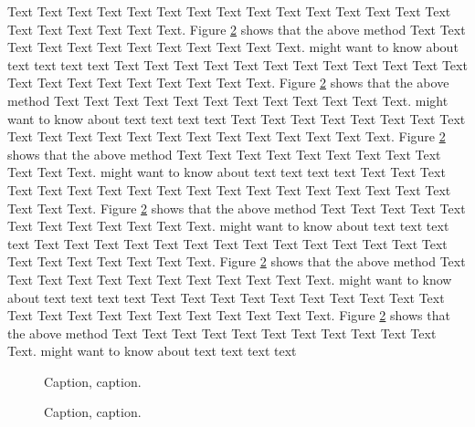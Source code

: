 \documentclass{Rpd}
\begin{document}
Text Text Text Text Text Text  Text Text Text Text Text Text Text Text Text  Text Text Text Text Text Text. Figure \ref{fig:02} shows that the above method  Text Text Text Text  Text Text Text Text Text Text  Text Text.  \cite{Boffelli03} might want to know about  text text text text
Text Text Text Text Text Text  Text Text Text Text Text Text Text Text Text  Text Text Text Text Text Text. Figure \ref{fig:02} shows that the above method  Text Text Text Text  Text Text Text Text Text Text  Text Text.  \cite{Boffelli03} might want to know about  text text text text
Text Text Text Text Text Text  Text Text Text Text Text Text Text Text Text  Text Text Text Text Text Text. Figure \ref{fig:02} shows that the above method  Text Text Text Text  Text Text Text Text Text Text  Text Text.  \cite{Boffelli03} might want to know about  text text text text
Text Text Text Text Text Text  Text Text Text Text Text Text Text Text Text  Text Text Text Text Text Text. Figure \ref{fig:02} shows that the above method  Text Text Text Text  Text Text Text Text Text Text  Text Text.  \cite{Boffelli03} might want to know about  text text text text
Text Text Text Text Text Text  Text Text Text Text Text Text Text Text Text  Text Text Text Text Text Text. Figure \ref{fig:02} shows that the above method  Text Text Text Text  Text Text Text Text Text Text  Text Text.  \cite{Boffelli03} might want to know about  text text text text
Text Text Text Text Text Text  Text Text Text Text Text Text Text Text Text  Text Text Text Text Text Text. Figure \ref{fig:02} shows that the above method  Text Text Text Text  Text Text Text Text Text Text  Text Text.  \cite{Boffelli03} might want to know about  text text text text


%
%


\begin{figure}%
\caption{Caption, caption.}\label{fig:01}
\end{figure}

\begin{figure}%
\caption{Caption, caption.}\label{fig:02}
\end{figure}
\end{document}
